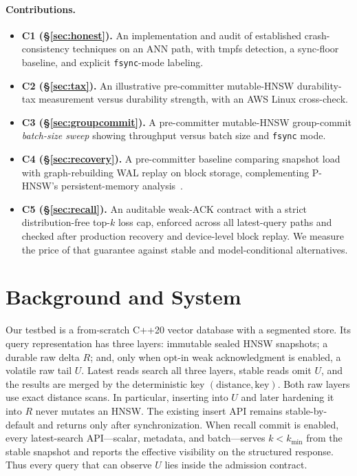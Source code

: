\documentclass[sigconf,nonacm,balance=false]{acmart}
\newcommand{\fsync}{\texttt{fsync}}
\begin{document}
\paragraph{Contributions.}
\begin{itemize}
\item \textbf{C1 (\S\ref{sec:honest}).} An implementation and audit of
established crash-consistency techniques on an ANN path, with tmpfs detection,
a sync-floor baseline, and explicit \fsync{}-mode labeling.
\item \textbf{C2 (\S\ref{sec:tax}).} An illustrative pre-committer
mutable-HNSW durability-tax
measurement versus durability strength, with an AWS Linux cross-check.
\item \textbf{C3 (\S\ref{sec:groupcommit}).} A pre-committer mutable-HNSW
group-commit \emph{batch-size sweep}
showing throughput versus batch size and \fsync{} mode.
\item \textbf{C4 (\S\ref{sec:recovery}).} A pre-committer baseline comparing
snapshot load with graph-rebuilding WAL replay on block storage, complementing
P-HNSW's persistent-memory analysis~\cite{phnsw}.
\item \textbf{C5 (\S\ref{sec:recall}).} An auditable weak-ACK contract with a
strict distribution-free top-$k$ loss cap, enforced across all latest-query
paths and checked after production recovery and device-level block replay. We
measure the price of that guarantee against stable and model-conditional
alternatives.
\end{itemize}

\section{Background and System}
\label{sec:background}
Our testbed is a from-scratch C++20 vector database with a segmented store. Its
query representation has three layers: immutable sealed HNSW snapshots; a durable
raw delta $R$; and, only when opt-in weak acknowledgment is enabled, a volatile
raw tail $U$. Latest reads search all three layers, stable reads omit $U$, and the
results are merged by the deterministic key $(\mathrm{distance},\mathrm{key})$.
Both raw layers use exact distance scans. In particular, inserting into $U$ and
later hardening it into $R$ never mutates an HNSW. The existing insert API remains
stable-by-default and returns only after synchronization. When recall commit is
enabled, every latest-search API---scalar, metadata, and batch---serves
$k<k_{\min}$ from the stable snapshot and reports the effective visibility on the
structured response. Thus every query that can observe $U$ lies inside the
admission contract.
\end{document}
